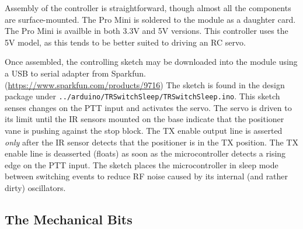 \documentclass[12pt]{article}
\begin{document}
Assembly of the controller is straightforward, though almost all the components
are surface-mounted. The Pro Mini is soldered to the module as a daughter card.
The Pro Mini is availble in both 3.3V and 5V versions.  This controller uses the
5V model, as this tends to be better suited to driving an RC servo.

Once assembled, the controlling sketch may be downloaded into the module using a
USB to serial adapter from Sparkfun. (\url{https://www.sparkfun.com/products/9716})
The sketch is found in the design package under {\tt ../arduino/TRSwitchSleep/TRSwitchSleep.ino}.
This sketch senses changes on the PTT input and activates the servo.
The servo is driven to its limit until the IR sensors mounted on the base indicate
that the positioner vane is pushing against the stop block. 
The TX enable output line is asserted {\em only} after the IR sensor detects
that the positioner is in the TX position.  The TX enable line is deasserted
(floats) as soon as the microcontroller detects a rising edge on the PTT input.
The sketch places the microcontroller in sleep mode between switching events to
reduce RF noise caused by its internal (and rather dirty) oscillators. 

\subsection{The Mechanical Bits}
\end{document}
